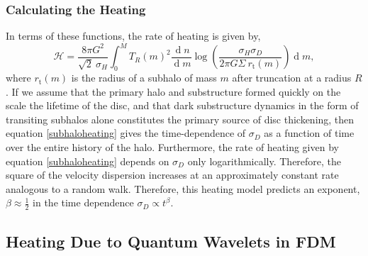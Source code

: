\documentclass[usenatbib]{mnras}
\renewcommand{\d}[1]{\! \mathrm{d}#1 \:}
\newcommand{\deriv}[2]{\frac{\d{#1}}{\d{#2}}}
\renewcommand{\d}[1]{\ensuremath{\operatorname{d}\!{#1}}}
\begin{document}
\subsubsection{Calculating the Heating}

In terms of these functions, the rate of heating is given by,
\begin{equation} \label{subhaloheating}
\mathcal{H} = \frac{8 \pi G^2}{\sqrt{2} \: \sigma_H} \int_0^{M} T_R(m)^2  \deriv{n}{m}  \log{\left( \frac{\sigma_H \sigma_D}{2 \pi G \Sigma \: r_{\text{t}}(m)} \right)} \d{m},
\end{equation}   
where $r_{\text{t}}(m)$ is the radius of a subhalo of mass $m$ after truncation at a radius $R$. 
If we assume that the primary halo and substructure formed quickly on the scale the lifetime of the disc, and that dark substructure dynamics in the form of transiting subhalos alone constitutes the primary source of disc thickening, then equation \eqref{subhaloheating} gives the time-dependence of $\sigma_D$ as a function of time over the entire history of the halo. Furthermore, the rate of heating given by equation \eqref{subhaloheating} depends on $\sigma_D$ only logarithmically. Therefore, the square of the velocity dispersion increases at an approximately constant rate analogous to a random walk. Therefore, this heating model predicts an exponent, $\beta \approx \tfrac{1}{2}$ in the time dependence $\sigma_D \propto t^{\beta}$.

\subsection{Heating Due to Quantum Wavelets in FDM}
\end{document}
